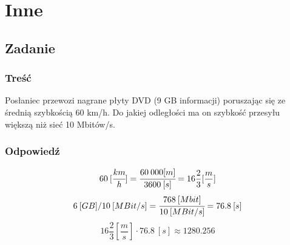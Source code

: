 \newpage
\section{Inne}
	\subsection{Zadanie}
		\subsubsection{Treść}
			Posłaniec przewozi nagrane płyty DVD (9 GB informacji) poruszając się ze średnią szybkością 60 km/h. Do jakiej odległości ma on szybkość przesyłu większą niż sieć 10 Mbitów/s.
		\subsubsection{Odpowiedź}
			$$ 60\:[\cfrac{km}{h}]=\cfrac{60\:000 [m]}{3600\:[s]}=16\frac{2}{3} [\frac{m}{s}] $$
			$$ 6\:[GB] / 10\:[MBit/s] = \cfrac{768\:[Mbit]}{10\:[MBit/s]}=76.8\:[s]$$
			$$ 16\frac{2}{3} [\frac{m}{s}] \cdot 76.8\:[s] \approx 1280.256 $$
			
			